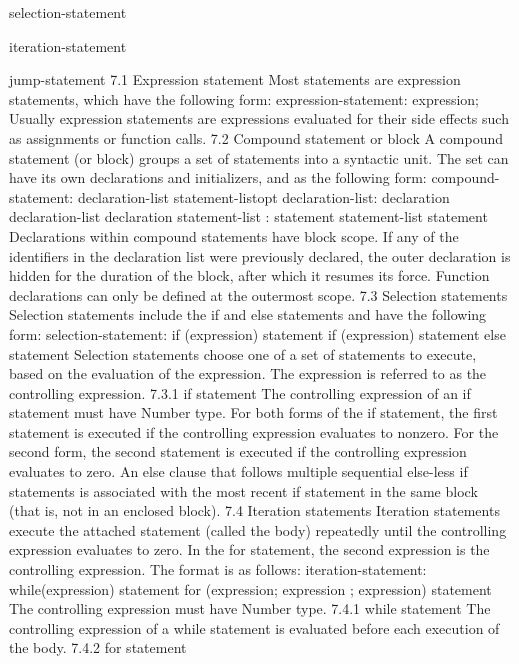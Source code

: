 \documentclass[12pt,A4]{book}
\begin{document}
        selection-statement

        iteration-statement

        jump-statement
7.1 Expression statement
Most statements are expression statements, which have the following form:
expression-statement:        expression;
Usually expression statements are expressions evaluated for their side effects such as assignments or function calls.
7.2 Compound statement or block
A compound statement (or block) groups a set of statements into a syntactic unit.  The set can have its own declarations and initializers, and as the following form:
compound-statement:        {declaration-list statement-listopt}
declaration-list:        declaration
                    declaration-list declaration
statement-list    :        statement
                    statement-list statement
Declarations within compound statements have block scope.  If any of the identifiers in the declaration list were previously declared, the outer declaration is hidden for the duration of the block, after which it resumes its force.  Function declarations can only be defined at the outermost scope.
7.3 Selection statements
Selection statements include the if and else statements and have the following form:
selection-statement:        if (expression) statement
                    if (expression) statement else statement
Selection statements choose one of a set of statements to execute, based on the evaluation of the expression.  The expression is referred to as the controlling expression.
7.3.1 if statement
The controlling expression of an if  statement must have Number type. For both forms of the if statement, the first statement is executed if the controlling expression evaluates to nonzero.  For the second form, the second statement is executed if the controlling expression evaluates to zero.  An else clause that follows multiple sequential else-less if statements is associated with the most recent if statement in the same block (that is, not in an enclosed block).
7.4 Iteration statements
Iteration statements execute the attached statement (called the body) repeatedly until the controlling expression evaluates to zero.  In the for statement, the second expression is the controlling expression.  The format is as follows:
iteration-statement:        while(expression) statement
            for (expression; expression ; expression) statement
The controlling expression must have Number type.
7.4.1 while statement
The controlling expression of a while statement is evaluated before each execution of the body.
7.4.2 for statement
\end{document}
